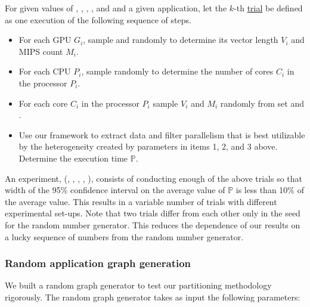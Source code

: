 For given values of \numtplgynodes, \gpunum, \veclenset, \corenumset, \mipsset
and \bw and a given application, let the $k$-th \ul{trial} be
defined as one execution of the following sequence of steps.

\begin{itemize}

\item For each GPU $G_i$, sample \veclenset and \mipsset randomly to
  determine its vector length $V_i$ and MIPS count $M_i$. \label{i1}

\item For each CPU $P_i$, sample \corenumset randomly to determine the
  number of cores $C_i$ in the processor $P_i$.~\label{i2}

\item For each core $C_i$ in the processor $P_i$ sample $V_i$ and $M_i$
  randomly from set \veclenset and \mipsset.

\item Use our framework to extract data and filter parallelism that is
  best utilizable by the heterogeneity created by parameters in items 1,
  2, and 3 above. Determine the execution time $\mathbb{P}$.

\end{itemize}

An experiment, \expt(\numtplgynodes, \gpunum, \veclenset, \corenumset
\mipsset, \bw), consists of conducting enough of the above trials so that
width of the 95\% confidence interval on the average value of
$\mathbb{P}$ is less than 10\% of the average value. This results in a variable
number of trials with different experimental set-ups. Note that two trials
differ from each other only in the seed for the random number generator.  This
reduces the dependence of our results on a lucky sequence of numbers from the
random number generator.

\subsubsection{Random application graph generation}
\label{sec:filter-graph-setup}

We built a random graph generator to test our partitioning methodology
rigorously. The random graph generator takes as input the following
parameters:

